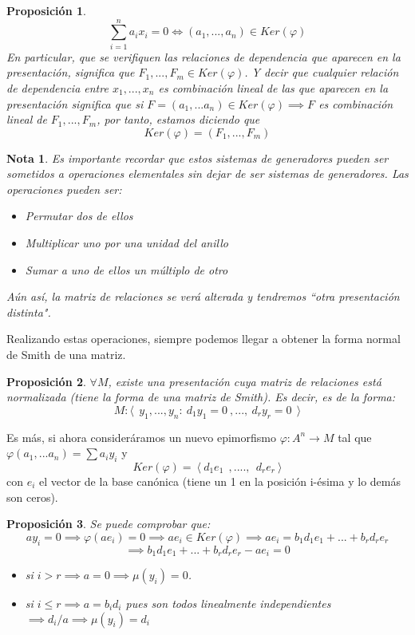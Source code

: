 \documentclass[11pt, a4paper, titlepage]{article}
\theoremstyle{theorem-style}
\newtheorem*{nprop}{Proposición}
\theoremstyle{definition-style}
\theoremstyle{remark-style}
\newtheorem*{nota}{Nota}
\theoremstyle{example-style}
\begin{document}
\begin{nprop}
	\[
	\sum_{i=1}^n a_i x_i  = 0 \iff (a_1,...,a_n) \in Ker(\varphi)
	\]
	En particular, que se verifiquen las relaciones de dependencia que aparecen en la presentación, significa que $F_1,...,F_m \in Ker(\varphi)$.
	Y decir que cualquier relación de dependencia entre $x_1,...,x_n$ es combinación lineal de las que aparecen en la presentación significa que si $F=(a_1,...a_n) \in Ker(\varphi) \implies F$ es combinación lineal de $F_1,...,F_m$, por tanto, estamos diciendo que
	\[
	Ker(\varphi) = (F_1,...,F_m)
	\]
\end{nprop}

\begin{nota}
	Es importante recordar que estos sistemas de generadores pueden ser sometidos a operaciones elementales sin dejar de ser sistemas de generadores. Las operaciones pueden ser:
	\begin{itemize}
	\item Permutar dos de ellos
	\item Multiplicar uno por una unidad del anillo
	\item Sumar a uno de ellos un múltiplo de otro
\end{itemize}
Aún así, la matriz de relaciones se verá alterada y tendremos “otra presentación distinta".
\end{nota}

Realizando estas operaciones, siempre podemos llegar a obtener la forma normal de Smith de una matriz.

\begin{nprop}
	$\forall M $, existe una presentación cuya matriz de relaciones está normalizada (tiene la forma de una matriz de Smith). Es decir, es de la forma:
	\[
	M : \langle \ \  y_1,...,y_n : \ d_1y_1 = 0 \ ,..., \ d_ry_r = 0 \ \  \rangle
	\]
	
\end{nprop}
Es más, si ahora consideráramos un nuevo epimorfismo $\varphi: A^n \to M$ tal que $\varphi (a_1,...a_n) = \sum a_i y_i$ y 
\[
Ker(\varphi)= \ \langle\  d_1e_1 \ \ , .... , \ \ d_r e_r \ \rangle
\]
con $e_i$ el vector de la base canónica (tiene un 1 en la posición i-ésima y lo demás son ceros).

\begin{nprop}
	Se puede comprobar que:
	\[
	ay_i = 0 \implies \varphi (ae_i) = 0 \implies ae_i \in Ker(\varphi) \implies ae_i = b_1d_1e_1+...+b_rd_re_r
	\]
	\[
	\implies b_1d_1e_1+...+b_rd_re_r - ae_i = 0
	\]
	\begin{itemize}
	\item  si $i>r \implies a = 0 \implies \mu(y_i) = 0$.
	\item si $i \leq r \implies a = b_id_i$ pues son todos linealmente independientes $\implies d_i/a \implies \mu(y_i) = d_i$
\end{itemize}
\end{nprop}
\end{document}
